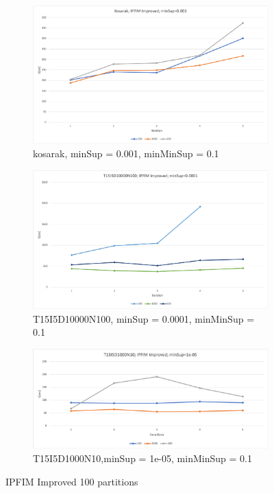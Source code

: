 \begin{figure}[H]
  \centering
  \begin{subfigure}{\textwidth}
  \centering
  \includegraphics[width=\linewidth]{figures/4iterations/kosarak_ipfim_imp_001}
  \caption{kosarak, minSup = 0.001,  minMinSup = 0.1}
  \label{fig:kosarak_ipfim_imp_001}
    \end{subfigure}  
  \begin{subfigure}{\textwidth}
    \centering
  \includegraphics[width=\linewidth]{figures/4iterations/T15I5D10000N100_ipfim_imp_0001}
  \caption{T15I5D10000N100, minSup = 0.0001,  minMinSup = 0.1}
  \label{fig:T15I5D10000N100_ipfim_imp_0001}
    \end{subfigure}  
  \begin{subfigure}{\textwidth}
    \centering
  \includegraphics[width=\linewidth]{figures/4iterations/T15I5D1000N10_ipfim_imp_00001}
  \caption{T15I5D1000N10,minSup = 1e-05,  minMinSup = 0.1}
  \label{fig:T15I5D1000N10_ipfim_imp_00001}
    \end{subfigure}  
    \caption{IPFIM Improved 100 partitions}
\end{figure}



